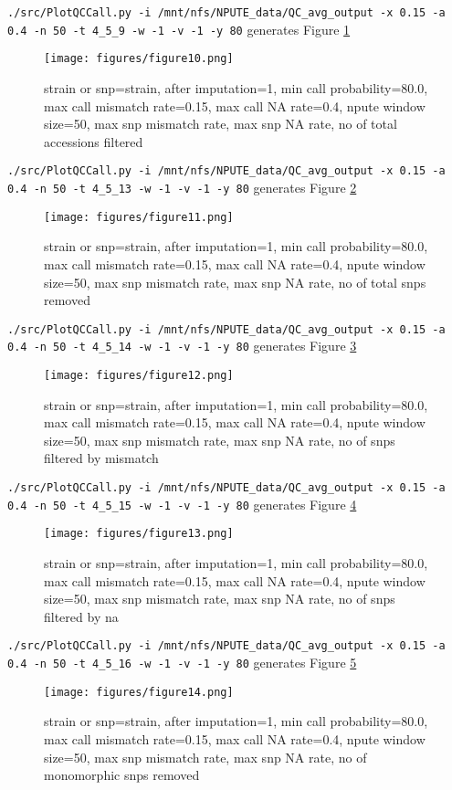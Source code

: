 \documentclass[a4paper,10pt]{article}
\begin{document}
\verb+./src/PlotQCCall.py -i /mnt/nfs/NPUTE_data/QC_avg_output -x 0.15 -a 0.4 -n 50 -t 4_5_9 -w -1 -v -1 -y 80+ generates Figure \ref{f10}
\begin{figure}
\texttt{[image: figures/figure10.png]}
\caption{strain or snp=strain, after imputation=1, min call probability=80.0, max call mismatch rate=0.15, max call NA rate=0.4, npute window size=50, max snp mismatch rate, max snp NA rate, no of total accessions filtered}\label{f10}
\end{figure}

\verb+./src/PlotQCCall.py -i /mnt/nfs/NPUTE_data/QC_avg_output -x 0.15 -a 0.4 -n 50 -t 4_5_13 -w -1 -v -1 -y 80+ generates Figure \ref{f11}
\begin{figure}
\texttt{[image: figures/figure11.png]}
\caption{strain or snp=strain, after imputation=1, min call probability=80.0, max call mismatch rate=0.15, max call NA rate=0.4, npute window size=50, max snp mismatch rate, max snp NA rate, no of total snps removed}\label{f11}
\end{figure}

\verb+./src/PlotQCCall.py -i /mnt/nfs/NPUTE_data/QC_avg_output -x 0.15 -a 0.4 -n 50 -t 4_5_14 -w -1 -v -1 -y 80+ generates Figure \ref{f12}
\begin{figure}
\texttt{[image: figures/figure12.png]}
\caption{strain or snp=strain, after imputation=1, min call probability=80.0, max call mismatch rate=0.15, max call NA rate=0.4, npute window size=50, max snp mismatch rate, max snp NA rate, no of snps filtered by mismatch}\label{f12}
\end{figure}

\verb+./src/PlotQCCall.py -i /mnt/nfs/NPUTE_data/QC_avg_output -x 0.15 -a 0.4 -n 50 -t 4_5_15 -w -1 -v -1 -y 80+ generates Figure \ref{f13}
\begin{figure}
\texttt{[image: figures/figure13.png]}
\caption{strain or snp=strain, after imputation=1, min call probability=80.0, max call mismatch rate=0.15, max call NA rate=0.4, npute window size=50, max snp mismatch rate, max snp NA rate, no of snps filtered by na}\label{f13}
\end{figure}

\verb+./src/PlotQCCall.py -i /mnt/nfs/NPUTE_data/QC_avg_output -x 0.15 -a 0.4 -n 50 -t 4_5_16 -w -1 -v -1 -y 80+ generates Figure \ref{f14}
\begin{figure}
\texttt{[image: figures/figure14.png]}
\caption{strain or snp=strain, after imputation=1, min call probability=80.0, max call mismatch rate=0.15, max call NA rate=0.4, npute window size=50, max snp mismatch rate, max snp NA rate, no of monomorphic snps removed}\label{f14}
\end{figure}
\end{document}
